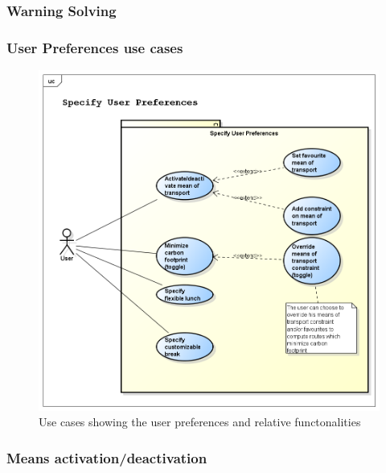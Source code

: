 \subsubsection{Warning Solving}



\newpage
\subsubsection{User Preferences use cases}
\begin{figure}[htp]
\includegraphics[width=\textwidth]{usecases/png/specifyuserpreferences} 
\caption{Use cases showing the user preferences and relative functonalities} 
\label{fig:specifyuserpreferences} 
\end{figure}

\newpage
\subsubsection{Means activation/deactivation}



